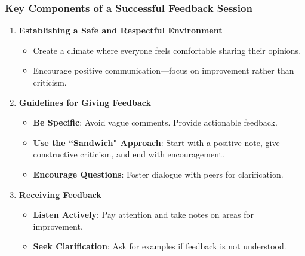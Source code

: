 \documentclass[aspectratio=169]{beamer}
\begin{document}
\begin{frame}[fragile]
    \frametitle{Key Components of a Successful Feedback Session}
    \begin{enumerate}
        \item \textbf{Establishing a Safe and Respectful Environment}
        \begin{itemize}
            \item Create a climate where everyone feels comfortable sharing their opinions.
            \item Encourage positive communication—focus on improvement rather than criticism.
        \end{itemize}

        \item \textbf{Guidelines for Giving Feedback}
        \begin{itemize}
            \item \textbf{Be Specific}: Avoid vague comments. Provide actionable feedback.
            \item \textbf{Use the ``Sandwich" Approach}: Start with a positive note, give constructive criticism, and end with encouragement.
            \item \textbf{Encourage Questions}: Foster dialogue with peers for clarification.
        \end{itemize}

        \item \textbf{Receiving Feedback}
        \begin{itemize}
            \item \textbf{Listen Actively}: Pay attention and take notes on areas for improvement.
            \item \textbf{Seek Clarification}: Ask for examples if feedback is not understood.
        \end{itemize}
    \end{enumerate}
\end{frame}
\end{document}
